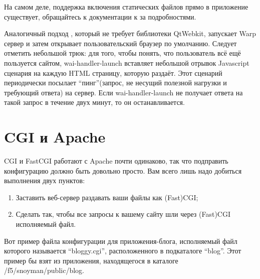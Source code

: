 На самом деле, поддержка включения статических файлов прямо в приложение существует, обращайтесь к документации к  за подробностями.
%

Аналогичный подход , который не требует библиотеки QtWebkit, запускает Warp сервер и затем открывает пользовательский браузер по умолчанию. Следует отметить небольшой трюк: для того, чтобы понять, что пользователь всё ещё пользуется сайтом, wai-handler-launch вставляет небольшой отрывок Javascript сценария на каждую HTML страницу, которую раздаёт. Этот сценарий периодически посылает ``пинг''(запрос, не несущий полезной нагрузки и требующий ответа) на сервер. Если wai-handler-launch не получает ответа на такой запрос в течение двух минут, то он останавливается.
%

\section{CGI и Apache}
%
%

CGI и FastCGI работают с Apache почти одинаково, так что подправить конфигурацию должно быть довольно просто. Вам всего лишь надо добиться выполнения двух пунктов:
\begin{enumerate}
  \item Заставить веб-сервер раздавать ваши файлы как (Fast)CGI;
  \item Сделать так, чтобы все запросы к вашему сайту шли через (Fast)CGI исполняемый файл.
\end{enumerate}

%
Вот пример файла конфигурации для приложения-блога, исполняемый файл которого называется ``bloggy.cgi'', расположенного в подкаталоге ``blog''. Этот пример бы взят из приложения, находящегося в каталоге /f5/snoyman/public/blog.

